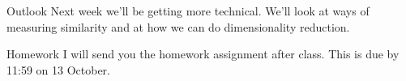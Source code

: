 \documentclass[
  10pt,
  ignorenonframetext,
  aspectratio=169]{beamer}
\newif\ifbibliography
\begin{document}
\begin{frame}{Outlook}
\protect\hypertarget{outlook}{}
Next week we'll be getting more technical. We'll look at ways of
measuring similarity and at how we can do dimensionality reduction.
\end{frame}

\begin{frame}{Homework}
\protect\hypertarget{homework}{}
I will send you the homework assignment after class. This is due by
11:59 on 13 October.
\end{frame}

\begin{frame}[allowframebreaks]{}
  \bibliographytrue
  
\end{frame}
\end{document}
